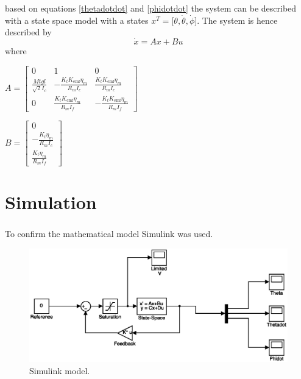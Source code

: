\documentclass[a4paper,11pt]{kth-mag}
\begin{document}
based on equations \eqref{thetadotdot} and \eqref{phidotdot} the system can be described with a state space model with a states $x^T = [\theta, \dot{\theta}, \dot{\phi}$]. The system is hence described by
\begin{equation}
\dot{x} = Ax + Bu
\end{equation} 
where \\
\begin{center}
$A =\begin{bmatrix}
0 & 1 & 0 \\
\frac{Mt g l }{\sqrt{2} I_c} & - \frac{K_t K_{\text{emf}} \eta_m}{R_m I_c} & \frac{K_t K_{\text{emf}} \eta_m}{R_m I_c} \\ 
0 & \frac{K_t K_{\text{emf}} \eta_m}{R_m I_f} & -\frac{K_t K_{\text{emf}} \eta_m}{R_m I_f}
\end{bmatrix}$

$B = \begin{bmatrix}
0 \\ 
-\frac{K_t \eta_m}{R_m I_c} \\
\frac{K_t \eta_m}{R_m I_f}
\end{bmatrix} $
\end{center}

\section{Simulation}
To confirm the mathematical model Simulink\textsuperscript{\textregistered} was used. 

\begin{figure}[!htb]
\centering
\includegraphics[scale=.7]{simmodel.eps}
\caption{Simulink model.}
\label{fig:simmodel}
\end{figure}
\end{document}
